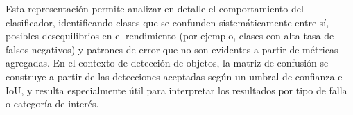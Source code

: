 \par Esta representación permite analizar en detalle el comportamiento del clasificador, identificando clases que se confunden sistemáticamente entre sí, posibles desequilibrios en el rendimiento (por ejemplo, clases con alta tasa de falsos negativos) y patrones de error que no son evidentes a partir de métricas agregadas. En el contexto de detección de objetos, la matriz de confusión se construye a partir de las detecciones aceptadas según un umbral de confianza e IoU, y resulta especialmente útil para interpretar los resultados por tipo de falla o categoría de interés. \\
